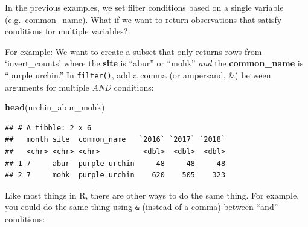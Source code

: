 \documentclass[]{book}
\newenvironment{Shaded}{\begin{snugshade}}{\end{snugshade}}
\newcommand{\CommentTok}[1]{\textcolor[rgb]{0.56,0.35,0.01}{\textit{#1}}}
\newcommand{\KeywordTok}[1]{\textcolor[rgb]{0.13,0.29,0.53}{\textbf{#1}}}
\newcommand{\NormalTok}[1]{#1}
\newcommand{\OperatorTok}[1]{\textcolor[rgb]{0.81,0.36,0.00}{\textbf{#1}}}
\newcommand{\StringTok}[1]{\textcolor[rgb]{0.31,0.60,0.02}{#1}}
\begin{document}
In the previous examples, we set filter conditions based on a single variable (e.g.~common\_name). What if we want to return observations that satisfy conditions for multiple variables?

For example: We want to create a subset that only returns rows from `invert\_counts' where the \textbf{site} is ``abur'' or ``mohk'' \emph{and} the \textbf{common\_name} is ``purple urchin.'' In \texttt{filter()}, add a comma (or ampersand, \&) between arguments for multiple \emph{AND} conditions:

\begin{Shaded}
\end{Shaded}

\begin{Shaded}
\begin{Highlighting}[]
\KeywordTok{head}\NormalTok{(urchin_abur_mohk)}
\end{Highlighting}
\end{Shaded}

\begin{verbatim}
## # A tibble: 2 x 6
##   month site  common_name   `2016` `2017` `2018`
##   <chr> <chr> <chr>          <dbl>  <dbl>  <dbl>
## 1 7     abur  purple urchin     48     48     48
## 2 7     mohk  purple urchin    620    505    323
\end{verbatim}

Like most things in R, there are other ways to do the same thing. For example, you could do the same thing using \texttt{\&} (instead of a comma) between ``and'' conditions:

\begin{Shaded}
\end{Shaded}
\end{document}
